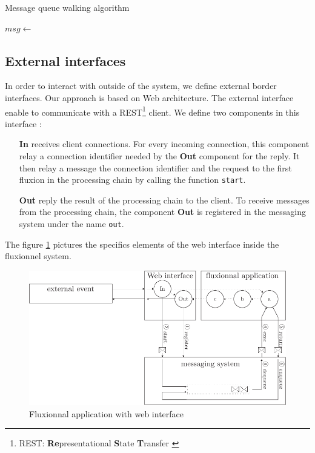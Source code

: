 \begin{algorithm}
\caption{Message queue walking algorithm}
\label{alg:parcours}
\begin{algorithmic}
\State $msg \gets$  
\State {}
\EndWhile
\EndFunction
\end{algorithmic}
\end{algorithm}

\subsection{External interfaces}

In order to interact with outside of the system, we define external border interfaces.
Our approach is based on Web architecture.
The external interface enable to communicate with a REST\footnote{REST: \textbf{Re}presentational \textbf{S}tate \textbf{T}ransfer \cite{Fielding2002}} client.
We define two components in this interface :

\begin{itemize}
	\item[\textbf{In}]
    receives client connections.
    For every incoming connection, this component relay a connection identifier needed by the \textbf{Out} component for the reply.
    It then relay a message the connection identifier and the request to the first fluxion in the processing chain by calling the function \texttt{start}.
	\item[\textbf{Out}]
    reply the result of the processing chain to the client.
    To receive messages from the processing chain, the component \textbf{Out} is registered in the messaging system under the name \texttt{out}.
\end{itemize}

The figure \ref{fig:schemaweb} pictures the specifics elements of the web interface inside the fluxionnel system.

\begin{figure}[h!]
	\includegraphics[width=\linewidth]{schema-web.pdf}
	\caption{Fluxionnal application with web interface}
	\label{fig:schemaweb}
\end{figure}

